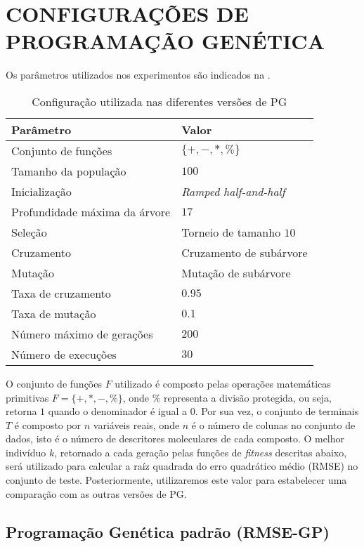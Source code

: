 \section{CONFIGURAÇÕES DE PROGRAMAÇÃO GENÉTICA}
\label{sec:5gpconfig}


Os parâmetros utilizados nos experimentos são indicados na .


\begin{table}[H]
    \begin{tabular}{ll}
    \toprule
	\textbf{Parâmetro}					&	\textbf{Valor} \\ 
	\midrule %
   	Conjunto de funções				&	$\{+,-,*,\%\}$	\\
   	Tamanho da população			& 	$100$ \\
	Inicialização					&	\emph{Ramped half-and-half} \\
	Profundidade máxima da árvore	&	$17$ \citep{Koza1992} \\
	Seleção							&	Torneio de tamanho $10$ \\
	Cruzamento						&	Cruzamento de subárvore \\
	Mutação							&	Mutação de subárvore \\
	Taxa de cruzamento				&	$0.95$ \\
	Taxa de mutação					&	$0.1$ \\
	Número máximo de gerações		&	$200$ \\
	Número de execuções				&	$30$ \\ 
	\bottomrule %
	\end{tabular} %
    \centering
    \caption{Configuração utilizada nas diferentes versões de \ac{PG}}
    \label{Tabela531}
\end{table}

O conjunto de funções $F$ utilizado é composto pelas operações matemáticas primitivas $F = \{+,*,-,\%\}$, onde ${\%}$ representa a 
divisão protegida, ou seja, retorna $1$ quando o denominador é igual a $0$. Por sua vez, o conjunto de terminais $T$ é composto por $n$
variáveis reais, onde $n$ é o número de colunas no conjunto de dados, isto é o número de descritores moleculares de cada composto. 
O melhor indivíduo $k$, retornado a cada geração pelas funções de \emph{fitness} descritas abaixo, será utilizado para calcular a raíz 
quadrada do erro quadrático médio (\ac{RMSE}) no conjunto de teste. Posteriormente, utilizaremos este 
valor para estabelecer uma comparação com as outras versões de \ac{PG}.

\subsection{Programação Genética padrão (RMSE-GP)}
\label{RMSEGP}

